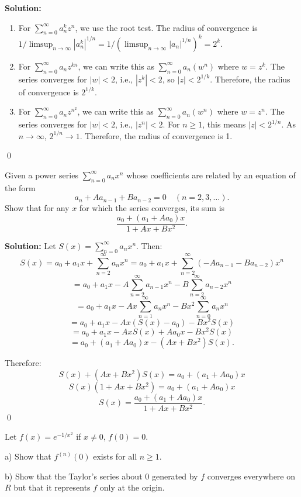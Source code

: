 \bigskip\noindent\textbf{Solution:}
\begin{enumerate}[label=(\alph*)]
\item For \( \sum_{n=0}^{\infty} a_n^k z^n \), we use the root test. The radius of convergence is \( 1/\limsup_{n\to\infty} |a_n^k|^{1/n} = 1/(\limsup_{n\to\infty} |a_n|^{1/n})^k = 2^k \).

\item For \( \sum_{n=0}^{\infty} a_nz^{kn} \), we can write this as \( \sum_{n=0}^{\infty} a_n(w^n) \) where \( w = z^k \). The series converges for \( |w| < 2 \), i.e., \( |z^k| < 2 \), so \( |z| < 2^{1/k} \). Therefore, the radius of convergence is \( 2^{1/k} \).

\item For \( \sum_{n=0}^{\infty} a_nz^{n^2} \), we can write this as \( \sum_{n=0}^{\infty} a_n(w^n) \) where \( w = z^n \). The series converges for \( |w| < 2 \), i.e., \( |z^n| < 2 \). For \( n \geq 1 \), this means \( |z| < 2^{1/n} \). As \( n \to \infty \), \( 2^{1/n} \to 1 \). Therefore, the radius of convergence is 1.
\end{enumerate}\qed


\begin{problembox}
Given a power series \( \sum_{n=0}^{\infty} a_nx^n \) whose coefficients are related by an equation of the form
\[ a_n + Aa_{n-1} + Ba_{n-2} = 0 \quad (n = 2, 3, \ldots). \]
Show that for any \( x \) for which the series converges, its sum is
\[ \frac{a_0 + (a_1 + Aa_0)x}{1 + Ax + Bx^2}. \]
\end{problembox}

\bigskip\noindent\textbf{Solution:} Let \( S(x) = \sum_{n=0}^{\infty} a_nx^n \). Then:
\[S(x) = a_0 + a_1x + \sum_{n=2}^{\infty} a_nx^n = a_0 + a_1x + \sum_{n=2}^{\infty} (-Aa_{n-1} - Ba_{n-2})x^n\]
\[= a_0 + a_1x - A\sum_{n=2}^{\infty} a_{n-1}x^n - B\sum_{n=2}^{\infty} a_{n-2}x^n\]
\[= a_0 + a_1x - Ax\sum_{n=1}^{\infty} a_nx^n - Bx^2\sum_{n=0}^{\infty} a_nx^n\]
\[= a_0 + a_1x - Ax(S(x) - a_0) - Bx^2S(x)\]
\[= a_0 + a_1x - AxS(x) + Aa_0x - Bx^2S(x)\]
\[= a_0 + (a_1 + Aa_0)x - (Ax + Bx^2)S(x).\]

Therefore:
\[S(x) + (Ax + Bx^2)S(x) = a_0 + (a_1 + Aa_0)x\]
\[S(x)(1 + Ax + Bx^2) = a_0 + (a_1 + Aa_0)x\]
\[S(x) = \frac{a_0 + (a_1 + Aa_0)x}{1 + Ax + Bx^2}.\]\qed


\begin{problembox}
Let \( f(x) = e^{-1/x^2} \) if \( x \neq 0 \), \( f(0) = 0 \).

a) Show that \( f^{(n)}(0) \) exists for all \( n \geq 1 \).

b) Show that the Taylor's series about 0 generated by \( f \) converges everywhere on \( R \) but that it represents \( f \) only at the origin.
\end{problembox}

